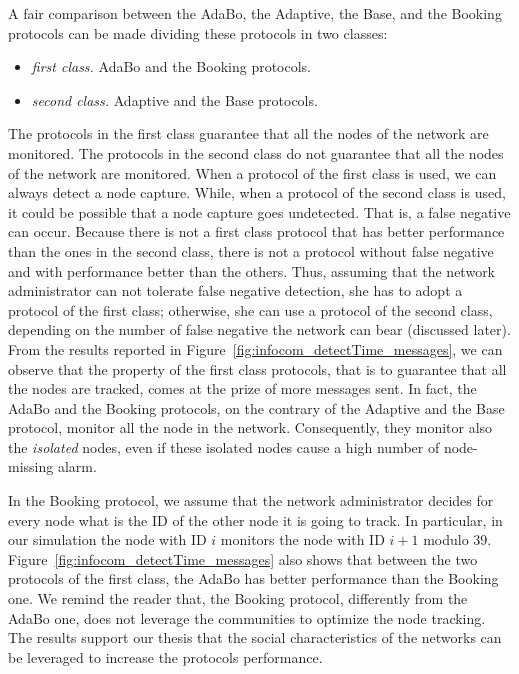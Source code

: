 \documentclass{IEEEconf}
\begin{document}
A fair comparison between the AdaBo, the Adaptive, the Base, and the Booking protocols can be made dividing these protocols in two classes:
\begin{itemize}
\item \textit{first class.} AdaBo and the Booking protocols.
\item \textit{second class.} Adaptive and the Base protocols.
\end{itemize}
The protocols in the first class guarantee that all the nodes of the network are monitored. The protocols in the second class do not guarantee that all the nodes of the network are monitored. When a protocol of the first class is used, we can always detect a node capture. While, when a protocol of the second class is used, it could be possible that a node capture goes undetected. That is, a false negative can occur. Because there is not a first class protocol that has better performance than the ones in the second class, there is not a protocol without false negative and with performance better than the others. Thus, assuming that the network administrator can not tolerate false negative detection, she has to adopt a protocol of the first class; otherwise, she can use a protocol of the second class, depending on the number of false negative the network can bear (discussed later). From the results reported in Figure~\ref{fig:infocom_detectTime_messages}, we can observe that the property of the first class protocols, that is to guarantee that all the nodes are tracked, comes at the prize of more messages sent. In fact, the AdaBo and the Booking protocols, on the contrary of the Adaptive and the Base protocol, monitor all the node in the network. Consequently, they monitor also the \textit{isolated} nodes, even if these isolated nodes cause a high number of node-missing alarm.

In the Booking protocol, we assume that the network administrator decides for every node what is the ID of the other node it is going to track. In particular, in our simulation the node with ID $i$ monitors the node with ID $i+1$ modulo 39. Figure~\ref{fig:infocom_detectTime_messages} also shows that between the two protocols of the first class, the AdaBo has better performance than the Booking one. We remind the reader that, the Booking protocol, differently from the AdaBo one, does not leverage the communities to optimize the node tracking. The results support our thesis that the social characteristics of the networks can be leveraged to increase the protocols performance.
\end{document}
